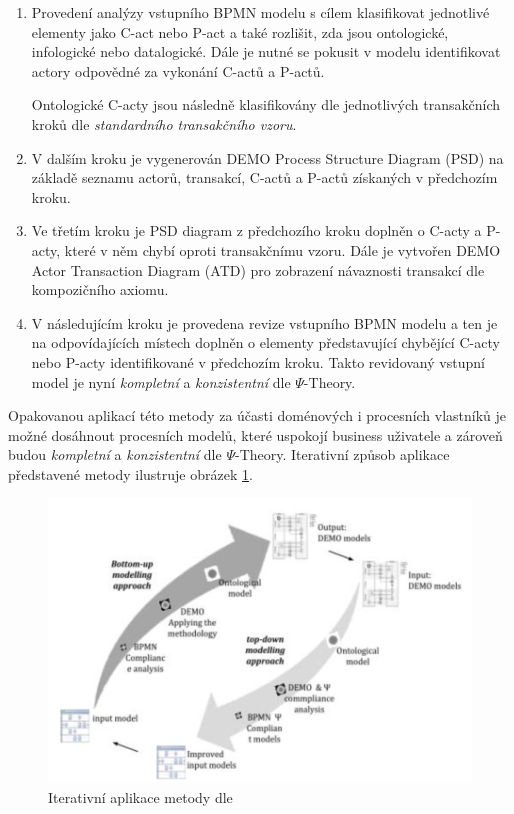 \documentclass[]{article}
\begin{document}
\begin{enumerate}
\item Provedení analýzy vstupního BPMN modelu s cílem klasifikovat jednotlivé elementy jako C-act nebo P-act a také rozlišit, zda jsou ontologické, infologické nebo datalogické. Dále je nutné se pokusit v modelu identifikovat actory odpovědné za vykonání C-actů a P-actů.

Ontologické C-acty jsou následně klasifikovány dle jednotlivých transakčních kroků dle \textit{standardního transakčního vzoru}.
\item V dalším kroku je vygenerován DEMO Process Structure Diagram (PSD) na základě seznamu actorů, transakcí, C-actů a P-actů získaných v předchozím kroku.
\item Ve třetím kroku je PSD diagram z předchozího kroku doplněn o C-acty a P-acty, které v něm chybí oproti transakčnímu vzoru. Dále je vytvořen DEMO Actor Transaction Diagram (ATD) pro zobrazení návaznosti transakcí dle kompozičního axiomu.
\item V následujícím kroku je provedena revize vstupního BPMN modelu a ten je na odpovídajících místech doplněn o elementy představující chybějící C-acty nebo P-acty identifikované v předchozím kroku. Takto revidovaný vstupní model je nyní \textit{kompletní} a \textit{konzistentní} dle $\Psi$-Theory.
\end{enumerate}

Opakovanou aplikací této metody za účasti doménových i procesních vlastníků je možné dosáhnout procesních modelů, které uspokojí business uživatele a zároveň budou \textit{kompletní} a \textit{konzistentní} dle $\Psi$-Theory. Iterativní způsob aplikace představené metody ilustruje obrázek \ref{fig:caetano-bpmn-demo-method}.

\begin{figure}[H]\centering
\includegraphics[width=\textwidth,height=\textheight,keepaspectratio]{obrazky/caetano-bpmn-demo-method}
\caption{Iterativní aplikace metody dle \cite{Caetano2011}}
\label{fig:caetano-bpmn-demo-method}
\end{figure}
\end{document}
